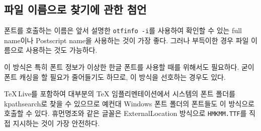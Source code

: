 \documentclass[
	12pt,
	a4paper,
	kosection,
	footnote,
	microtype,
	figtabcapt,
]{oblivoir}
\def\util#1{\texttt{#1}}
\newcommand\xobclass{x\-ob\-liv\-oir\oblivoirallowbreak}
\begin{document}
\subsection{파일 이름으로 찾기에 관한 첨언}

폰트를 호출하는 이름은 앞서 설명한 \util{otfinfo -i}를 사용하여 확인할 수 있는
full name이나 Postscript name을 사용하는 것이 가장 좋다. 그러나 부득이한 경우 
파일 이름으로 사용하는 것도 가능하다.

이 방식은 특히 폰트 정보가 이상한 한글 폰트를 사용할 때를 위해서도
필요하다.
굳이 폰트 캐싱을 할 필요가 줄어들기도 하므로, 이 방식을 선호하는 경우도 있다.

\TeX\,Live를 포함하여 대부분의 \TeX{} 임플리멘테이션에서 시스템의 폰트 폴더를 kpathsearch로
찾을 수 있으므로 예컨대 Windows 폰트 폴더의 폰트들도 이 방식으로 호출할 수 있다.
휴먼명조와 같은 글꼴은 ExternalLocation 방식으로 \verb|HMKMM.TTF|를 
직접 지시하는 것이 가장 안전하다.
\end{document}

